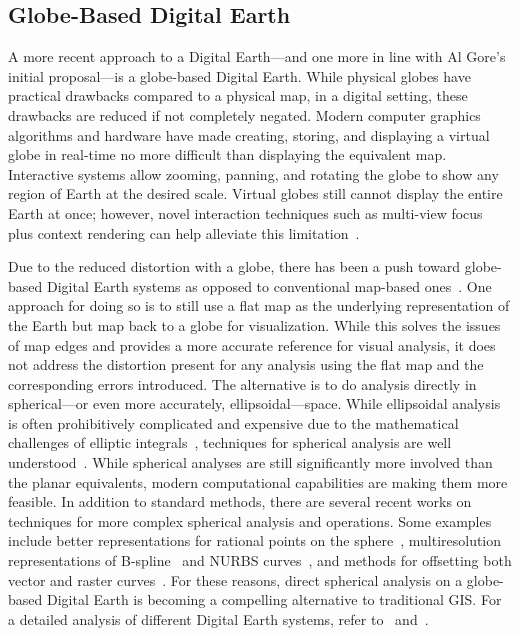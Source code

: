 \subsection{Globe-Based Digital Earth} \label{chap:2:globeDE}
A more recent approach to a Digital Earth---and one more in line with Al Gore's initial proposal---is a globe-based Digital Earth.
While physical globes have practical drawbacks compared to a physical map, in a digital setting, these drawbacks are reduced if not completely negated.
Modern computer graphics algorithms and hardware have made creating, storing, and displaying a virtual globe in real-time no more difficult than displaying the equivalent map.
Interactive systems allow zooming, panning, and rotating the globe to show any region of Earth at the desired scale.
Virtual globes still cannot display the entire Earth at once; however, novel interaction techniques such as multi-view focus plus context rendering can help alleviate this limitation~\cite{sherlock2017visualizations}.


Due to the reduced distortion with a globe, there has been a push toward globe-based Digital Earth systems as opposed to conventional map-based ones~\cite{goodchild2018reimagining}.
One approach for doing so is to still use a flat map as the underlying representation of the Earth but map back to a globe for visualization.
While this solves the issues of map edges and provides a more accurate reference for visual analysis, it does not address the distortion present for any analysis using the flat map and the corresponding errors introduced.
The alternative is to do analysis directly in spherical---or even more accurately, ellipsoidal---space.
While ellipsoidal analysis is often prohibitively complicated and expensive due to the mathematical challenges of elliptic integrals~\cite{byrd2013handbook}, techniques for spherical analysis are well understood~\cite{raskin1994spatial}.
While spherical analyses are still significantly more involved than the planar equivalents, modern computational capabilities are making them more feasible. 
In addition to standard methods, there are several recent works on techniques for more complex spherical analysis and operations.
Some examples include better representations for rational points on the sphere~\cite{bahrdt2017rational}, multiresolution representations of B-spline~\cite{alderson2016multiresolution} and NURBS curves~\cite{alderson2019multiscale}, and methods for offsetting both vector and raster curves~\cite{alderson2018offsetting}.
For these reasons, direct spherical analysis on a globe-based Digital Earth is becoming a compelling alternative to traditional GIS. For a detailed analysis of different Digital Earth systems, refer to~\cite{mahdavi2015survey} and~\cite{alderson2020digital}.


